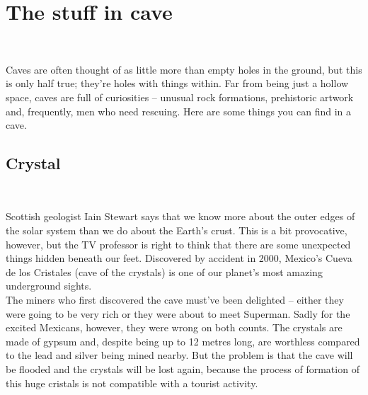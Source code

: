 \documentclass[draft, final]{report}
\begin{document}
\chapter{The stuff in cave}
~\par
Caves are often thought of as little more than empty holes in the ground, but this is only half true; they’re holes with things within. Far from being just a hollow space, caves are full of curiosities – unusual rock formations, prehistoric artwork and, frequently, men who need rescuing.
Here are some things you can find in a cave.
\section{Crystal}
~\par
Scottish geologist Iain Stewart says that we know more about the outer edges of the solar system than we do about the Earth’s crust. This is a bit provocative, however, but the TV professor is right to think that there are some unexpected things hidden beneath our feet. Discovered by accident in 2000, Mexico’s Cueva de los Cristales (cave of the crystals) is one of our planet’s most amazing underground sights.\\
The miners who first discovered the cave must’ve been delighted – either they were going to be very rich or they were about to meet Superman. Sadly for the excited Mexicans, however, they were wrong on both counts. The crystals are made of gypsum and, despite being up to 12 metres long, are worthless compared to the lead and silver being mined nearby. But the problem is that the cave will be flooded and the crystals will be lost again, because the process of formation of this huge cristals is not compatible with a tourist activity.\\
\end{document}
